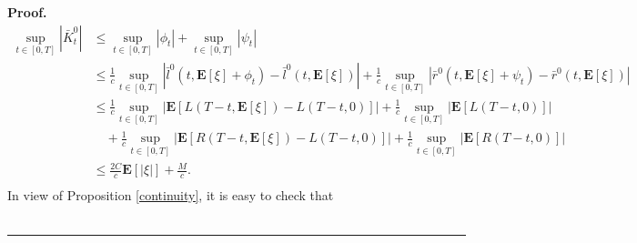 \documentclass[10pt]{article}%
\numberwithin{equation}{section}
\newenvironment{proof}[1][Proof]{\noindent \textbf{#1.} }{\  \rule{0.5em}{0.5em}}
\def \E{\mathbf{E}}
\begin{document}
\begin{proof}
\begin{equation}
\begin{split}
\sup_{t\in[0,T]}\left|\bar{K}^{0}_{t}\right|%
&\leq \sup_{t\in[0,T]}\left|\phi_{t}\right|+\sup_{t\in[0,T]}\left|\psi_{t}\right|\\
&\leq \frac{1}{c} \sup_{t\in[0,T]}\left|\bar{l}^0(t,\E[\xi]+ \phi_t)-\bar{l}^0(t,\E[\xi])\right|+ \frac{1}{c} \sup_{t\in[0,T]}\left|\bar{r}^0(t,\E[\xi]+ \psi_t)-\bar{r}^0(t,\E[\xi])\right|\\
&\leq \frac{1}{c} \sup_{t\in[0,T]}\left|\E[L(T-t, \E[\xi])-L(T-t,0)]\right|+ \frac{1}{c} \sup_{t\in[0,T]}\left|\E[L(T-t,0)]\right|\\
&\quad+\frac{1}{c} \sup_{t\in[0,T]}\left|\E[R(T-t, \E[\xi])-L(T-t,0)]\right|+ \frac{1}{c} \sup_{t\in[0,T]}\left|\E[R(T-t,0)]\right|\\
&\leq \frac{2C}{c}\mathbf{E}[\left|\xi\right|]+\frac{M}{c}.\\
\end{split}\end{equation}
 In view of Proposition \ref{continuity}, it is easy to check that %
\begin{equation}\label{barKK0}

\end{equation}
\end{proof}
\end{document}
